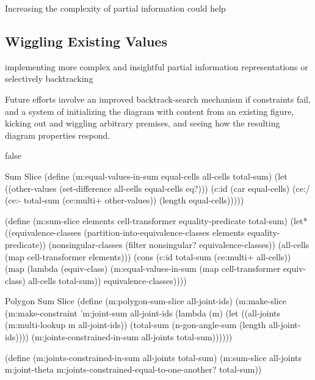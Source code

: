 Increasing the complexity of partial information could help

\subsection{Wiggling Existing Values}

implementing more
complex and insightful partial information representations or
selectively backtracking

Future efforts involve an improved backtrack-search mechanism if
constraints fail, and a system of initializing the diagram with
content from an existing figure, kicking out and wiggling arbitrary
premises, and seeing how the resulting diagram properties respond.




\if false
\begin{code-listing}
[label=sum-slice]
{Sum Slice}
(define (m:equal-values-in-sum equal-cells all-cells total-sum)
  (let ((other-values (set-difference all-cells equal-cells eq?)))
    (c:id (car equal-cells)
          (ce:/ (ce:- total-sum (ce:multi+ other-values))
                (length equal-cells)))))

(define (m:sum-slice elements cell-transformer equality-predicate total-sum)
  (let* ((equivalence-classes
          (partition-into-equivalence-classes elements equality-predicate))
         (nonsingular-classes (filter nonsingular? equivalence-classes))
         (all-cells (map cell-transformer elements)))
    (cons (c:id total-sum (ce:multi+ all-cells))
          (map (lambda (equiv-class)
                 (m:equal-values-in-sum
                  (map cell-transformer equiv-class) all-cells total-sum))
               equivalence-classes))))
\end{code-listing}

\begin{code-listing}
[label=poly-sum-slice]
{Polygon Sum Slice}
(define (m:polygon-sum-slice all-joint-ids)
  (m:make-slice
   (m:make-constraint 'm:joint-sum all-joint-ids
    (lambda (m)
      (let ((all-joints (m:multi-lookup m all-joint-ids))
            (total-sum (n-gon-angle-sum (length all-joint-ids))))
        (m:joints-constrained-in-sum all-joints total-sum))))))

(define (m:joints-constrained-in-sum all-joints total-sum)
  (m:sum-slice all-joints m:joint-theta
   m:joints-constrained-equal-to-one-another? total-sum))
\end{code-listing}


\fi
